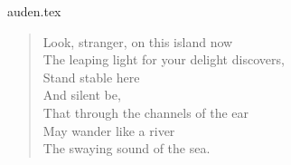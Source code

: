 \begin{filecontents*}{auden.tex}
\begin{verse}
Look, stranger, on this island now \\
The leaping light for your 
delight discovers, \\
Stand stable here \\
And silent be, \\
That through the channels of the ear \\
May wander like a river \\
The swaying sound of the sea. 
\end{verse}
\end{filecontents*}

\documentclass[a4paper,amsmath]{oblivoir}

\usepackage{fapapersize}
\usefapapersize{*,*,1in,*,1in,*}

\makeatletter
\let\ATonum\@onum
\makeatother

\usepackage[hcr]{kstextks}    %
\usepackage{refcount}
\usepackage{ob-mathleading}
\ifxetex
\usepackage[normalem]{ulem}
\fi


\usepackage{lipsum}
\usepackage{manfnt}
\usepackage{etoolbox}
\usepackage{filecontents}
\let\bs\relax
\usepackage{latexdemo}

\usepackage{xcolor}
\usepackage{efbox}
\usepackage{graphicx}
\usepackage{hologo}
\usepackage{relsize}
\usepackage{tcolorbox}

\setmainfont{TeX Gyre Pagella}
\setsansfont{Noto Sans}
\setmonofont{Noto Sans Mono}
\setkomainfont(Noto Serif CJK KR)(* Bold)(Noto Sans CJK KR)[CharRaise=-.0125em]
()( Bold)( Medium)
\usepackage{unicode-math}

\newcommand\bangotsuite{\stepcounter{sub}\thesub}

\usepackage{tikz}
\newcommand\tikzlogo{Ti\textit{k}Z}
\usetikzlibrary{shadows}

\setlength{\parindent}{0mm}

\newcommand\pkg[1]{\textsf{#1}}

\ExplSyntaxOn 

 {o}
{
    \IfValueTF { #1 }
    {
        \int_set:Nn \l_tmpa_int { #1 }
    }
    {
        \int_set:Nn \l_tmpa_int { 1 }
    }
    \noindent \rule {\linewidth}{3pt}
    \par 
    \sffamily [No.\space\int_use:N \l_tmpa_int ]\ \ 
    \bfseries
}
{
    \hfill \underline{\hphantom{2019}}년~\underline{\hphantom{06}}월~ \underline{\hphantom{25}}일 
    \par 
    \vskip -.3\baselineskip 
    \noindent \rule {\linewidth }{1pt}
    \par 
    \vskip .5\baselineskip 
}

